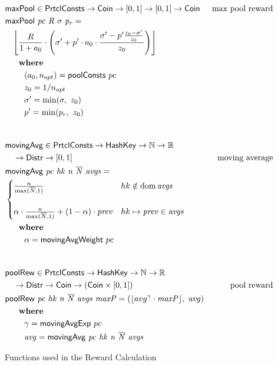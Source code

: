 \begin{figure}[htb]
  \begin{align*}
      & \fun{maxPool} \in \PrtclConsts \to \Coin \to [0, 1] \to [0,1] \to \Coin
      & \text{max pool reward} \\
      & \fun{maxPool}~\var{pc}~\var{R}~\sigma~\var{p_r} = \\
      & ~~~\floor*{
           \frac{R}{1 + a_0}
           \cdot
           \left(\sigma' + p'\cdot a_0\cdot\frac{\sigma' - p'\frac{z_0-\sigma'}{z_0}}{z_0}\right)} \\
      & ~~~\where \\
      & ~~~~~~~(a_0, n_{opt}) = \fun{poolConsts}~pc \\
      & ~~~~~~~z_0 = 1/n_{opt} \\
      & ~~~~~~~\sigma'=\min(\sigma,~z_0) \\
      & ~~~~~~~p'=\min(p_r,~z_0) \\
      \nextdef
      & \fun{movingAvg} \in \PrtclConsts \to \HashKey \to \mathbb{N} \to \mathbb{R} \\
      & ~~~\to \Distr \to [0, 1]
      & \text{moving average} \\
      & \fun{movingAvg}~\var{pc}~\var{hk}~\var{n}~\var{\overline{N}}~\var{avgs} = \\
      & \begin{cases}
        \frac{n}{\max(\overline{N}, 1)}
        & hk\notin \dom\var{avgs}\\
        \\
          \alpha\cdot\frac{n}{\max(\overline{N}, 1)}+(1-\alpha)\cdot\var{prev}
        & hk\mapsto\var{prev}\in\var{avgs}\\
        \end{cases} \\
      & ~~~\where \\
      & ~~~~~~~\alpha = \fun{movingAvgWeight}~pc \\
      \nextdef
      & \fun{poolRew} \in \PrtclConsts \to \HashKey \to \mathbb{N} \to \mathbb{R} \\
      & ~~~\to \Distr \to \Coin \to (\Coin \times [0, 1])
      & \text{pool reward} \\
      & \fun{poolRew}~\var{pc}~\var{hk}~\var{n}~\var{\overline{N}}~\var{avgs}~\var{maxP} =
      (\floor*{avg^\gamma\cdot \var{maxP}},~\var{avg})\\
      & ~~~\where \\
      & ~~~~~~~\gamma = \fun{movingAvgExp}~pc \\
      & ~~~~~~~\var{avg} = \fun{movingAvg}~\var{pc}~\var{hk}~\var{n}~\var{\overline{N}}~\var{avgs} \\
  \end{align*}
  \caption{Functions used in the Reward Calculation}
  \label{fig:functions:rewards}
\end{figure}

